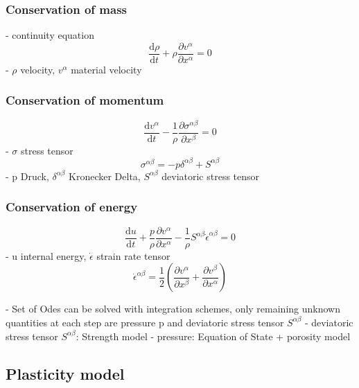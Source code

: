 \subsubsection{Conservation of mass}
- continuity equation
\begin{equation}
    \frac{\mathrm {d}\rho }{\mathrm {d}t} + \rho \frac{\partial v^{\alpha} }{\partial x^\alpha} = 0
\end{equation}
- $\rho$ velocity, $v^{\alpha}$ material velocity

\subsubsection{Conservation of momentum}

\begin{equation} \label{eq:momentum}
    \frac{\mathrm {d} v^{\alpha} }{\mathrm {d}t} - \frac{1}{\rho} \frac{\partial \sigma^{\alpha \beta} }{\partial x^{\beta}} = 0
\end{equation}
- $\sigma$ stress tensor
\begin{equation}
    \sigma^{\alpha \beta} = - p\delta^{\alpha \beta} + S^{\alpha \beta}
\end{equation}
- p Druck, $\delta^{\alpha \beta}$ Kronecker Delta, $S^{\alpha \beta}$ deviatoric stress tensor

\subsubsection{Conservation of energy}
\begin{equation}
    \frac{\mathrm {d} u }{\mathrm {d}t} + \frac{p}{\rho} \frac{\partial v^{\alpha} }{\partial x^\alpha} - \frac{1}{\rho} S^{\alpha \beta} \dot{\epsilon}^{\alpha \beta} = 0
\end{equation}
- u internal energy, $\dot{\epsilon}$ strain rate tensor
\begin{equation}
    \dot{\epsilon}^{\alpha \beta} = \frac{1}{2} \left(\frac{\partial v^{\alpha} }{\partial x^\beta} + \frac{\partial v^{\beta} }{\partial x^\alpha}\right)
\end{equation}

- Set of Odes can be solved with integration schemes, only remaining unknown quantities at each step are pressure p and deviatoric stress tensor $S^{\alpha \beta}$
- deviatoric stress tensor $S^{\alpha \beta}$: Strength model
- pressure: Equation of State + porosity model

\subsection{Plasticity model}

